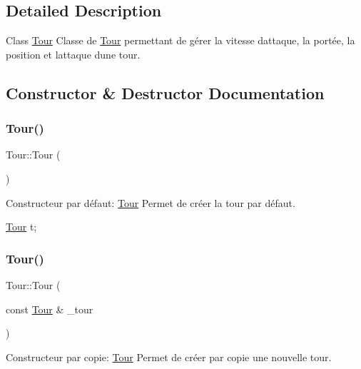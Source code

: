 \subsection{Detailed Description}
Class \hyperlink{classTour}{Tour} Classe de \hyperlink{classTour}{Tour} permettant de gérer la vitesse d\textquotesingle{}attaque, la portée, la position et l\textquotesingle{}attaque d\textquotesingle{}une tour. 

\subsection{Constructor \& Destructor Documentation}
\mbox{\label{classTour_a85e0f0e2346d1e42a09a80c1cd6d19c4}} 
\subsubsection{\texorpdfstring{Tour()}{Tour()}\hspace{0.1cm}{\footnotesize\ttfamily [1/3]}}
{\footnotesize\ttfamily Tour\+::\+Tour (\begin{DoxyParamCaption}{ }\end{DoxyParamCaption})}



Constructeur par défaut\+: \hyperlink{classTour}{Tour} Permet de créer la tour par défaut. 


\begin{DoxyCode}
\hyperlink{classTour}{Tour} t;
\end{DoxyCode}
 \mbox{\label{classTour_a3e25a64c74446192ac71283e08db4e49}} 
\subsubsection{\texorpdfstring{Tour()}{Tour()}\hspace{0.1cm}{\footnotesize\ttfamily [2/3]}}
{\footnotesize\ttfamily Tour\+::\+Tour (\begin{DoxyParamCaption}\item[{const \hyperlink{classTour}{Tour} \&}]{\+\_\+tour }\end{DoxyParamCaption})}



Constructeur par copie\+: \hyperlink{classTour}{Tour} Permet de créer par copie une nouvelle tour. 


